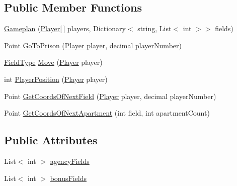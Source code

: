 \subsection*{Public Member Functions}
\begin{DoxyCompactItemize}
\item 
\mbox{\hyperlink{class_monopoly_1_1_main_1_1_gameplan_a7df64a00b6e9b3f080d99533f3c0754a}{Gameplan}} (\mbox{\hyperlink{class_monopoly_1_1_players_1_1_player}{Player}}\mbox{[}$\,$\mbox{]} players, Dictionary$<$ string, List$<$ int $>$$>$ fields)
\item 
Point \mbox{\hyperlink{class_monopoly_1_1_main_1_1_gameplan_ae3890109e75eee2c5e0278d22c085351}{Go\+To\+Prison}} (\mbox{\hyperlink{class_monopoly_1_1_players_1_1_player}{Player}} player, decimal player\+Number)
\item 
\mbox{\hyperlink{class_monopoly_1_1_main_1_1_gameplan_a460f9e6d576d65d9ad9fe2b291ee2344}{Field\+Type}} \mbox{\hyperlink{class_monopoly_1_1_main_1_1_gameplan_a13be4352f77013b7921655145b59324b}{Move}} (\mbox{\hyperlink{class_monopoly_1_1_players_1_1_player}{Player}} player)
\item 
int \mbox{\hyperlink{class_monopoly_1_1_main_1_1_gameplan_ac2b68af09cce82875419779d1cdc9523}{Player\+Position}} (\mbox{\hyperlink{class_monopoly_1_1_players_1_1_player}{Player}} player)
\item 
Point \mbox{\hyperlink{class_monopoly_1_1_main_1_1_gameplan_a17fcb8981b51471f7a01382192fdf13a}{Get\+Coords\+Of\+Next\+Field}} (\mbox{\hyperlink{class_monopoly_1_1_players_1_1_player}{Player}} player, decimal player\+Number)
\item 
Point \mbox{\hyperlink{class_monopoly_1_1_main_1_1_gameplan_a8d2691546583099ccecadc963393306d}{Get\+Coords\+Of\+Next\+Apartment}} (int field, int apartment\+Count)
\end{DoxyCompactItemize}
\subsection*{Public Attributes}
\begin{DoxyCompactItemize}
\item 
List$<$ int $>$ \mbox{\hyperlink{class_monopoly_1_1_main_1_1_gameplan_a279e1607bb8aeec59b6a4f9c5cd62d14}{agency\+Fields}}
\item 
List$<$ int $>$ \mbox{\hyperlink{class_monopoly_1_1_main_1_1_gameplan_ab3cffaf5db7de9445f163017fc6280f2}{bonus\+Fields}}
\end{DoxyCompactItemize}


